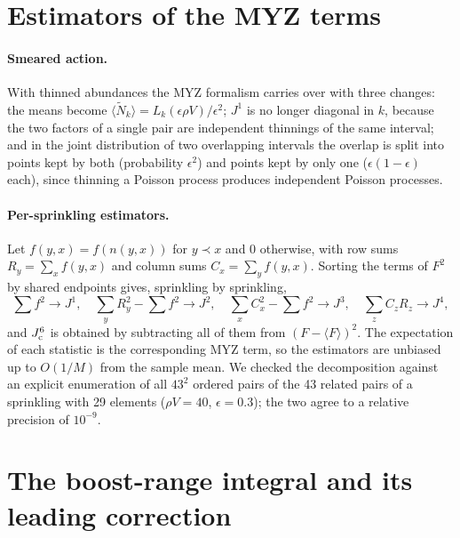 \documentclass{iopjournal}
\newcommand{\rhoV}{\rho V}
\newcommand{\Jone}{J^{1}}
\begin{document}
\section{Estimators of the MYZ terms}
\label{app:estimators}

\paragraph{Smeared action.} With thinned abundances the MYZ formalism carries
over with three changes: the means become
$\langle\tilde N_k\rangle=L_k(\epsilon\rhoV)/\epsilon^2$; $\Jone$ is no longer
diagonal in $k$, because the two factors of a single pair are independent
thinnings of the same interval; and in the joint distribution of two
overlapping intervals the overlap is split into points kept by both
(probability $\epsilon^2$) and points kept by only one ($\epsilon(1-\epsilon)$
each), since thinning a Poisson process produces independent Poisson
processes.

\paragraph{Per-sprinkling estimators.} Let $f(y,x)=f(n(y,x))$ for $y\prec x$
and $0$ otherwise, with row sums $R_y=\sum_xf(y,x)$ and column sums
$C_x=\sum_yf(y,x)$. Sorting the terms of $F^2$ by shared endpoints gives,
sprinkling by sprinkling,
\begin{equation}
\sum f^2\to\Jone,\quad
\sum_yR_y^2-\sum f^2\to J^2,\quad
\sum_xC_x^2-\sum f^2\to J^3,\quad
\sum_zC_zR_z\to J^4,
\end{equation}
and $J^6_{\rm c}$ is obtained by subtracting all of them from $(F-\langle
F\rangle)^2$. The expectation of each statistic is the corresponding MYZ term,
so the estimators are unbiased up to $O(1/M)$ from the sample mean. We checked
the decomposition against an explicit enumeration of all $43^2$ ordered pairs
of the 43 related pairs of a sprinkling with 29 elements ($\rhoV=40$,
$\epsilon=0.3$); the two agree to a relative precision of $10^{-9}$.

\section{The boost-range integral and its leading correction}
\label{app:boost}
\end{document}
